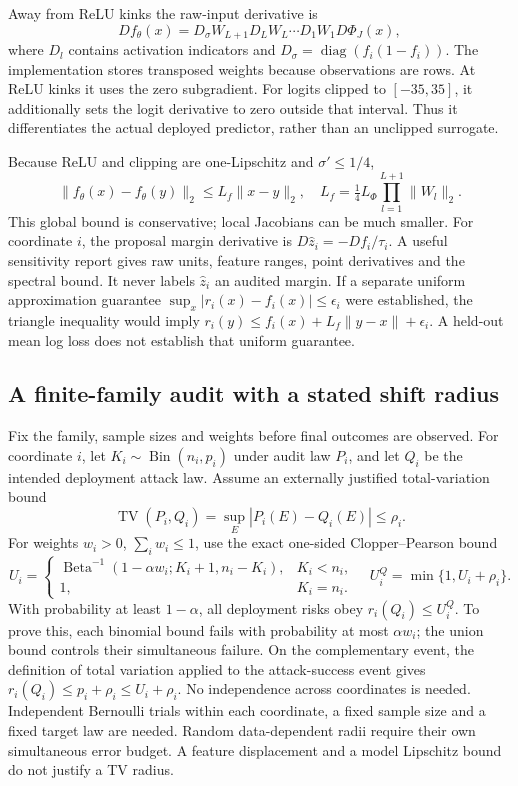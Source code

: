 Away from ReLU kinks the raw-input derivative is
\begin{equation}
 Df_\theta(x)=D_\sigma W_{L+1}D_LW_L\cdots D_1W_1D\Phi_J(x),
\end{equation}
where $D_l$ contains activation indicators and
$D_\sigma=\operatorname{diag}(f_i(1-f_i))$. The implementation stores transposed
weights because observations are rows. At ReLU kinks it uses the zero
subgradient. For logits clipped to $[-35,35]$, it additionally sets the
logit derivative to zero outside that interval. Thus it differentiates the
actual deployed predictor, rather than an unclipped surrogate.

Because ReLU and clipping are one-Lipschitz and $\sigma'\le1/4$,
\begin{equation}
 \|f_\theta(x)-f_\theta(y)\|_2\le
 L_f\|x-y\|_2,\quad L_f=\tfrac14 L_\Phi\prod_{l=1}^{L+1}\|W_l\|_2.
\end{equation}
This global bound is conservative; local Jacobians can be much smaller.
For coordinate $i$, the proposal margin derivative is
$D\widehat z_i=-Df_i/\tau_i$. A useful sensitivity report gives raw units,
feature ranges, point derivatives and the spectral bound. It never labels
$\widehat z_i$ an audited margin. If a separate uniform approximation guarantee
$\sup_x|r_i(x)-f_i(x)|\le\epsilon_i$ were established, the triangle inequality
would imply $r_i(y)\le f_i(x)+L_f\|y-x\|+\epsilon_i$. A held-out mean log loss
does not establish that uniform guarantee.

\subsection{A finite-family audit with a stated shift radius}
Fix the family, sample sizes and weights before final outcomes are observed.
For coordinate $i$, let $K_i\sim\operatorname{Bin}(n_i,p_i)$ under audit law
$P_i$, and let $Q_i$ be the intended deployment attack law. Assume an externally
justified total-variation bound
\begin{equation}
 \operatorname{TV}(P_i,Q_i)=\sup_E|P_i(E)-Q_i(E)|\le\rho_i.
\end{equation}
For weights $w_i>0$, $\sum_iw_i\le1$, use the exact one-sided
Clopper--Pearson bound
\begin{equation}
 U_i=\begin{cases}
 \operatorname{Beta}^{-1}(1-\alpha w_i;K_i+1,n_i-K_i),&K_i<n_i,\\
 1,&K_i=n_i.
 \end{cases}
 \quad U_i^Q=\min\{1,U_i+\rho_i\}.
\end{equation}
With probability at least $1-\alpha$, all deployment risks obey
$r_i(Q_i)\le U_i^Q$. To prove this, each binomial bound fails with probability
at most $\alpha w_i$; the union bound controls their simultaneous failure.
On the complementary event, the definition of total variation applied to the
attack-success event gives $r_i(Q_i)\le p_i+\rho_i\le U_i+\rho_i$.
No independence across coordinates is needed. Independent Bernoulli trials
within each coordinate, a fixed sample size and a fixed target law are needed.
Random data-dependent radii require their own simultaneous error budget.
A feature displacement and a model Lipschitz bound do not justify a TV radius.

